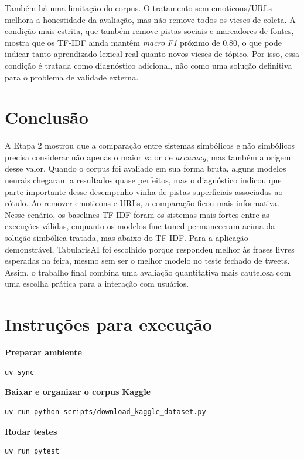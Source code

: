 \documentclass[11pt,a4paper]{article}
\newcommand{\commandlabel}[1]{\Needspace{7\baselineskip}\vspace{0.25em}\noindent\textbf{#1}\par\vspace{-0.35em}}
\begin{document}
Também há uma limitação do corpus. O tratamento sem emoticons/URLs melhora a honestidade da avaliação, mas não remove todos os vieses de coleta. A condição mais estrita, que também remove pistas sociais e marcadores de fontes, mostra que os TF-IDF ainda mantêm \emph{macro F1} próximo de 0,80, o que pode indicar tanto aprendizado lexical real quanto novos vieses de tópico. Por isso, essa condição é tratada como diagnóstico adicional, não como uma solução definitiva para o problema de validade externa.

\section{Conclusão}

A Etapa 2 mostrou que a comparação entre sistemas simbólicos e não simbólicos precisa considerar não apenas o maior valor de \emph{accuracy}, mas também a origem desse valor. Quando o corpus foi avaliado em sua forma bruta, alguns modelos neurais chegaram a resultados quase perfeitos, mas o diagnóstico indicou que parte importante desse desempenho vinha de pistas superficiais associadas ao rótulo. Ao remover emoticons e URLs, a comparação ficou mais informativa. Nesse cenário, os baselines TF-IDF foram os sistemas mais fortes entre as execuções válidas, enquanto os modelos fine-tuned permaneceram acima da solução simbólica tratada, mas abaixo do TF-IDF. Para a aplicação demonstrável, TabularisAI foi escolhido porque respondeu melhor às frases livres esperadas na feira, mesmo sem ser o melhor modelo no teste fechado de tweets. Assim, o trabalho final combina uma avaliação quantitativa mais cautelosa com uma escolha prática para a interação com usuários.

\section{Instruções para execução}

\commandlabel{Preparar ambiente}
\begin{lstlisting}[style=commandblock]
uv sync
\end{lstlisting}

\commandlabel{Baixar e organizar o corpus Kaggle}
\begin{lstlisting}[style=commandblock]
uv run python scripts/download_kaggle_dataset.py
\end{lstlisting}

\commandlabel{Rodar testes}
\begin{lstlisting}[style=commandblock]
uv run pytest
\end{lstlisting}
\end{document}
